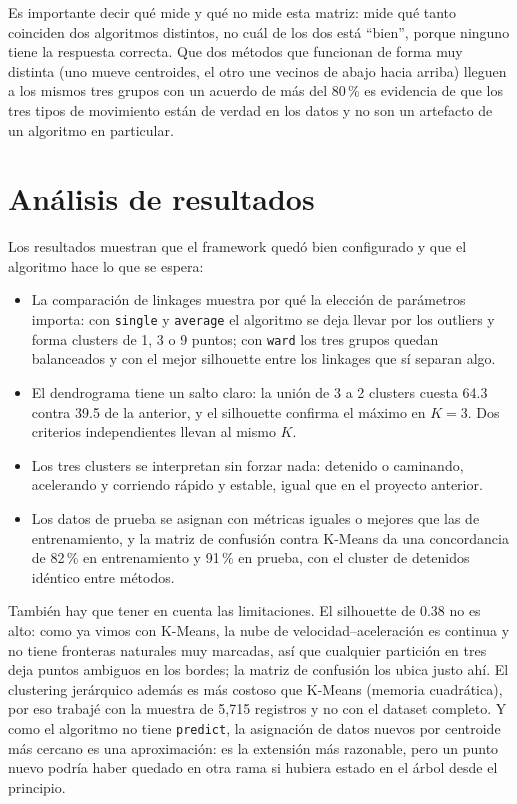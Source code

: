 \documentclass[11pt,a4paper]{article}
\begin{document}
Es importante decir qué mide y qué no mide esta matriz: mide qué tanto coinciden dos algoritmos distintos, no cuál de los dos está ``bien'', porque ninguno tiene la respuesta correcta. Que dos métodos que funcionan de forma muy distinta (uno mueve centroides, el otro une vecinos de abajo hacia arriba) lleguen a los mismos tres grupos con un acuerdo de más del 80\,\% es evidencia de que los tres tipos de movimiento están de verdad en los datos y no son un artefacto de un algoritmo en particular.

\section{Análisis de resultados}

Los resultados muestran que el framework quedó bien configurado y que el algoritmo hace lo que se espera:

\begin{itemize}
  \item La comparación de linkages muestra por qué la elección de parámetros importa: con \texttt{single} y \texttt{average} el algoritmo se deja llevar por los outliers y forma clusters de 1, 3 o 9 puntos; con \texttt{ward} los tres grupos quedan balanceados y con el mejor silhouette entre los linkages que sí separan algo.
  \item El dendrograma tiene un salto claro: la unión de 3 a 2 clusters cuesta 64.3 contra 39.5 de la anterior, y el silhouette confirma el máximo en $K=3$. Dos criterios independientes llevan al mismo $K$.
  \item Los tres clusters se interpretan sin forzar nada: detenido o caminando, acelerando y corriendo rápido y estable, igual que en el proyecto anterior.
  \item Los datos de prueba se asignan con métricas iguales o mejores que las de entrenamiento, y la matriz de confusión contra K-Means da una concordancia de 82\,\% en entrenamiento y 91\,\% en prueba, con el cluster de detenidos idéntico entre métodos.
\end{itemize}

También hay que tener en cuenta las limitaciones. El silhouette de 0.38 no es alto: como ya vimos con K-Means, la nube de velocidad--aceleración es continua y no tiene fronteras naturales muy marcadas, así que cualquier partición en tres deja puntos ambiguos en los bordes; la matriz de confusión los ubica justo ahí. El clustering jerárquico además es más costoso que K-Means (memoria cuadrática), por eso trabajé con la muestra de 5{,}715 registros y no con el dataset completo. Y como el algoritmo no tiene \texttt{predict}, la asignación de datos nuevos por centroide más cercano es una aproximación: es la extensión más razonable, pero un punto nuevo podría haber quedado en otra rama si hubiera estado en el árbol desde el principio.
\end{document}
